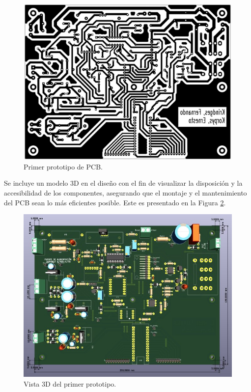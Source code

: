 \begin{figure}[H]
    \centering
    \includegraphics[width=\textwidth]{./imagenes/pcb_v1.jpg}
    \caption{Primer prototipo de PCB.}
    \label{F:PCB_V1}
\end{figure}
Se incluye un modelo 3D en el diseño con el fin de visualizar la disposición y la accesibilidad de los componentes, asegurando que el montaje y el mantenimiento del PCB sean lo más eficientes posible. Este es presentado en la Figura \ref{F:PCB_3D}.
\begin{figure}[H]
    \centering
    \includegraphics[width=\textwidth]{./imagenes/prototipo1.jpg}
    \caption{Vista 3D del primer prototipo.}
    \label{F:PCB_3D}
\end{figure} \par 
